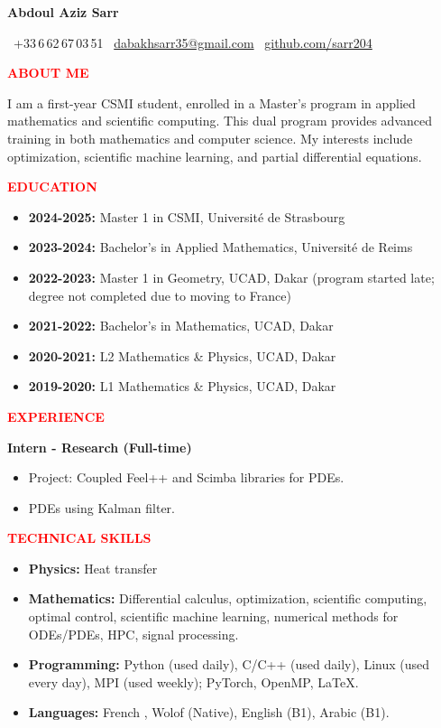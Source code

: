 \documentclass[12pt,a4paper]{article}
\newcommand{\cvsection}[1]{%
  \vspace{10pt}
  \noindent\makebox[\linewidth]{\rule{\textwidth}{1.5pt}}
  \vspace{2pt}
  \noindent\textcolor{red}{\textbf{\LARGE #1}}
  \vspace{2pt}
  \noindent\makebox[\linewidth]{\rule{\textwidth}{0.5pt}}
  \vspace{6pt}
}
\begin{document}
\begin{center}
  {\Huge \textbf{Abdoul Aziz Sarr}}
  
  \faPhone\ +33\,6\,62\,67\,03\,51\quad
  \faEnvelope\ \href{mailto:dabakhsarr35@gmail.com}{dabakhsarr35@gmail.com} \quad
  \faGithub\ \href{https://github.com/sarr204}{github.com/sarr204}
\end{center}

\vspace{10pt}

\cvsection{ABOUT ME}
I am a first-year CSMI student, enrolled in a Master's program in applied mathematics and scientific computing. This dual program provides advanced training in both mathematics and computer science. My interests include optimization, scientific machine learning, and partial differential equations.

\cvsection{EDUCATION}
\begin{itemize}[leftmargin=*,itemsep=3pt]
  \item \textbf{2024-2025:} Master 1 in CSMI, Université de Strasbourg
  \item \textbf{2023-2024:} Bachelor's in Applied Mathematics, Université de Reims
  \item \textbf{2022-2023:} Master 1 in Geometry, UCAD, Dakar (program started late; degree not completed due to moving to France)
  \item \textbf{2021-2022:} Bachelor's in Mathematics, UCAD, Dakar
  \item \textbf{2020-2021:} L2 Mathematics \& Physics, UCAD, Dakar
  \item \textbf{2019-2020:} L1 Mathematics \& Physics, UCAD, Dakar
\end{itemize}

\cvsection{EXPERIENCE}
\textbf{Intern - Research (Full-time)}
\begin{itemize}[leftmargin=*,noitemsep]
  \item Project: Coupled Feel++ and Scimba libraries for PDEs.
  \item PDEs using Kalman filter.
\end{itemize}

\cvsection{TECHNICAL SKILLS}
\begin{itemize}[leftmargin=*,noitemsep]
\item \textbf{Physics:} Heat transfer
  \item \textbf{Mathematics:} Differential calculus, optimization, scientific computing, optimal control, scientific machine learning, numerical methods for ODEs/PDEs, HPC, signal processing.
  \item \textbf{Programming:} Python (used daily), C/C++ (used daily), Linux (used every day), MPI (used weekly); PyTorch, OpenMP, \LaTeX.
  \item \textbf{Languages:} French , Wolof (Native), English (B1), Arabic (B1).
\end{itemize}
\end{document}
